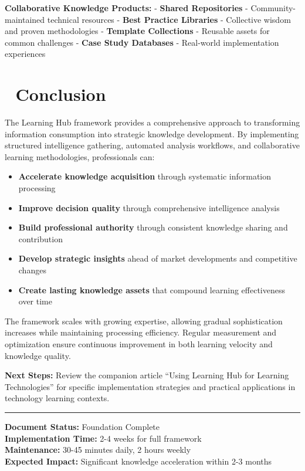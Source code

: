 \documentclass[
  letterpaper,
  DIV=11,
  numbers=noendperiod]{scrartcl}
\providecommand{\tightlist}{%
  \setlength{\itemsep}{0pt}\setlength{\parskip}{0pt}}\usepackage{longtable,booktabs,array}
\begin{document}
\textbf{Collaborative Knowledge Products:} - \textbf{Shared
Repositories} - Community-maintained technical resources - \textbf{Best
Practice Libraries} - Collective wisdom and proven methodologies -
\textbf{Template Collections} - Reusable assets for common challenges -
\textbf{Case Study Databases} - Real-world implementation experiences

\section{🎯 Conclusion}\label{conclusion}

The Learning Hub framework provides a comprehensive approach to
transforming information consumption into strategic knowledge
development. By implementing structured intelligence gathering,
automated analysis workflows, and collaborative learning methodologies,
professionals can:

\begin{itemize}
\tightlist
\item
  \textbf{Accelerate knowledge acquisition} through systematic
  information processing
\item
  \textbf{Improve decision quality} through comprehensive intelligence
  analysis
\item
  \textbf{Build professional authority} through consistent knowledge
  sharing and contribution
\item
  \textbf{Develop strategic insights} ahead of market developments and
  competitive changes
\item
  \textbf{Create lasting knowledge assets} that compound learning
  effectiveness over time
\end{itemize}

The framework scales with growing expertise, allowing gradual
sophistication increases while maintaining processing efficiency.
Regular measurement and optimization ensure continuous improvement in
both learning velocity and knowledge quality.

\textbf{Next Steps:} Review the companion article ``Using Learning Hub
for Learning Technologies'' for specific implementation strategies and
practical applications in technology learning contexts.

\begin{center}\rule{0.5\linewidth}{0.5pt}\end{center}

\textbf{Document Status:} Foundation Complete\\
\textbf{Implementation Time:} 2-4 weeks for full framework\\
\textbf{Maintenance:} 30-45 minutes daily, 2 hours weekly\\
\textbf{Expected Impact:} Significant knowledge acceleration within 2-3
months
\end{document}
